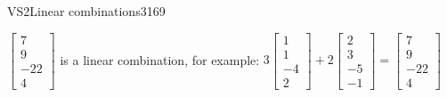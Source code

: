 \begin{exercise}{VS2}{Linear combinations}{3169}
\begin{exerciseAnswer}
\begin{itemize}
 

 \(\left[\begin{array}{c}
7 \\
9 \\
-22 \\
4
\end{array}\right]\) is a linear combination, for example: \(
3 \left[\begin{array}{c}
1 \\
1 \\
-4 \\
2
\end{array}\right] + 2 \left[\begin{array}{c}
2 \\
3 \\
-5 \\
-1
\end{array}\right] = \left[\begin{array}{c}
7 \\
9 \\
-22 \\
4
\end{array}\right]
                            \) 

 
\end{itemize}

     \end{exerciseAnswer}
 \end{exercise}



